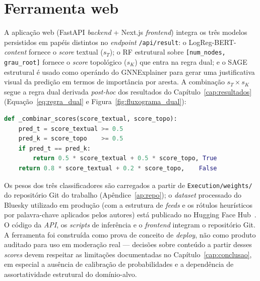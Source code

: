 \section{Ferramenta web}
\label{sec:ap_ferramenta}

A aplica\c{c}\~ao web (FastAPI \emph{backend} + Next.js \emph{frontend})
integra os tr\^es modelos persistidos em pap\'eis distintos no
\emph{endpoint} \texttt{/api/result}: o LogReg-BERT-\emph{content}
fornece o \emph{score} textual ($s_T$); o RF estrutural sobre
\texttt{[num\_nodes, grau\_root]} fornece o \emph{score} topol\'ogico
($s_K$) que entra na regra dual; e o SAGE estrutural \'e usado como
oper\'ando do GNNExplainer para gerar uma justificativa visual da
predi\c{c}\~ao em termos de import\^ancia por aresta. A combina\c{c}\~ao
$s_T \times s_K$ segue a regra dual derivada \emph{post-hoc} dos
resultados do Cap\'itulo~\ref{cap:resultados}
(Equa\c{c}\~ao~\ref{eq:regra_dual} e Figura~\ref{fig:fluxograma_dual}):

\begin{lstlisting}[language=Python, basicstyle=\small\ttfamily, frame=single,
                   caption={Trecho da regra dual no \emph{backend} FastAPI.},
                   label={lst:dual_api}]
def _combinar_scores(score_textual, score_topo):
    pred_t = score_textual >= 0.5
    pred_k = score_topo    >= 0.5
    if pred_t == pred_k:
        return 0.5 * score_textual + 0.5 * score_topo, True
    return 0.8 * score_textual + 0.2 * score_topo,    False
\end{lstlisting}

Os pesos dos tr\^es classificadores s\~ao carregados a partir de
\texttt{Execution/weights/} do reposit\'orio Git do trabalho
(Ap\^endice~\ref{ap:repo}); o \emph{dataset} processado do Bluesky
utilizado em produ\c{c}\~ao (com a estrutura de \emph{feeds} e os
r\'otulos heur\'isticos por palavra-chave aplicados pelos autores)
est\'a publicado no Hugging Face Hub~\cite{sibila2025bluesky}. O
c\'odigo da \emph{API}, os \emph{scripts} de infer\^encia e o
\emph{frontend} integram o reposit\'orio Git. A ferramenta foi constru\'ida como prova de
concei\-to de \emph{deploy}, n\~ao como produto auditado para uso em
modera\c{c}\~ao real --- decis\~oes sobre conte\'udo a partir desses
\emph{scores} devem respeitar as limita\c{c}\~oes documentadas no
Cap\'itulo~\ref{cap:conclusao}, em especial a aus\^encia de
calibra\c{c}\~ao de probabilidades e a depend\^encia de assortatividade
estrutural do dom\'inio-alvo.
